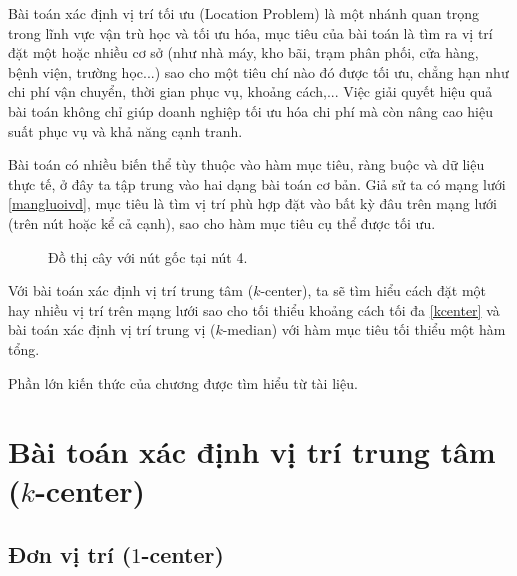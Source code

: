 \documentclass[12pt,a4paper]{report}
\begin{document}
Bài toán xác định vị trí tối ưu (Location Problem) là một nhánh quan trọng trong lĩnh vực vận trù học và tối ưu hóa, mục tiêu của bài toán là tìm ra vị trí đặt một hoặc nhiều cơ sở (như nhà máy, kho bãi, trạm phân phối, cửa hàng, bệnh viện, trường học...) sao cho một tiêu chí nào đó được tối ưu, chẳng hạn như chi phí vận chuyển, thời gian phục vụ, khoảng cách,... Việc giải quyết hiệu quả bài toán không chỉ giúp doanh nghiệp tối ưu hóa chi phí mà còn nâng cao hiệu suất phục vụ và khả năng cạnh tranh.

Bài toán có nhiều biến thể tùy thuộc vào hàm mục tiêu, ràng buộc và dữ liệu thực tế, ở đây ta tập trung vào hai dạng bài toán cơ bản. Giả sử ta có mạng lưới \eqref{mangluoivd}, mục tiêu là tìm vị trí phù hợp đặt vào bất kỳ đâu trên mạng lưới (trên nút hoặc kể cả cạnh), sao cho hàm mục tiêu cụ thể được tối ưu.


\begin{figure}[h!]
    \centering
    \caption{\label{mangluoivd} Đồ thị cây với nút gốc tại nút 4.}
\end{figure}

Với bài toán xác định vị trí trung tâm ($k$-center), ta sẽ tìm hiểu cách đặt một hay nhiều vị trí trên mạng lưới sao cho tối thiểu khoảng cách tối đa \eqref{kcenter} và bài toán xác định vị trí trung vị ($k$-median) với hàm mục tiêu tối thiểu một hàm tổng.

Phần lớn kiến thức của chương được tìm hiểu từ tài liệu.

\section{Bài toán xác định vị trí trung tâm ($k$-center)} \label{kcenter}
\subsection{Đơn vị trí ($1$-center)}
\end{document}
